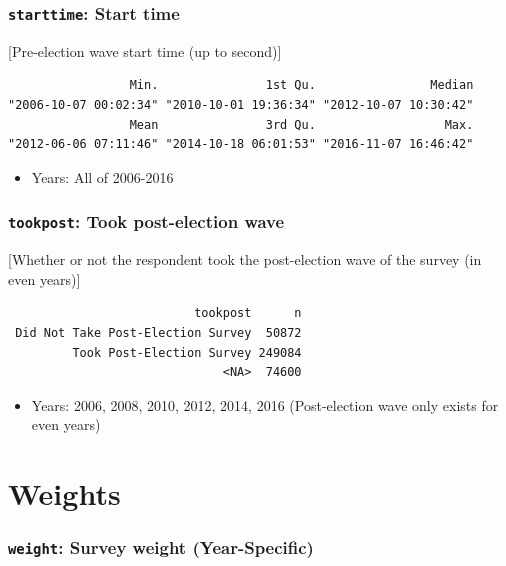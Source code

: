 \documentclass[10pt,article,oneside]{memoir}
\theoremstyle{definition}
\begin{document}
\subsubsection{\texorpdfstring{\texttt{starttime}: Start
time}{starttime: Start time}}\label{starttime-start-time}

{[}Pre-election wave start time (up to second){]}

\begin{verbatim}
                 Min.               1st Qu.                Median 
"2006-10-07 00:02:34" "2010-10-01 19:36:34" "2012-10-07 10:30:42" 
                 Mean               3rd Qu.                  Max. 
"2012-06-06 07:11:46" "2014-10-18 06:01:53" "2016-11-07 16:46:42" 
\end{verbatim}

\begin{itemize}
\tightlist
\item
  Years: All of 2006-2016
\end{itemize}

\subsubsection{\texorpdfstring{\texttt{tookpost}: Took post-election
wave}{tookpost: Took post-election wave}}\label{tookpost-took-post-election-wave}

{[}Whether or not the respondent took the post-election wave of the
survey (in even years){]}

\begin{verbatim}
                          tookpost      n
 Did Not Take Post-Election Survey  50872
         Took Post-Election Survey 249084
                              <NA>  74600
\end{verbatim}

\begin{itemize}
\tightlist
\item
  Years: 2006, 2008, 2010, 2012, 2014, 2016 (Post-election wave only
  exists for even years)
\end{itemize}

\section{Weights}\label{weights}

\subsubsection{\texorpdfstring{\texttt{weight}: Survey weight
(Year-Specific)}{weight: Survey weight (Year-Specific)}}\label{weight-survey-weight-year-specific}
\end{document}
